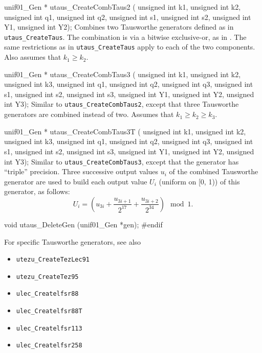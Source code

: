 unif01_Gen * utaus_CreateCombTaus2 (
   unsigned int k1, unsigned int k2, unsigned int q1, unsigned int q2,
   unsigned int s1, unsigned int s2, unsigned int Y1, unsigned int Y2);
\endcode
  \tab  Combines two Tausworthe generators defined as in
   {\tt utaus\_CreateTaus}. The combination is via a bitwise exclusive-or,
   as in \cite{rLEC96a,rTEZ89a,rTEZ91b}.
   The same restrictions as in  {\tt utaus\_CreateTaus} apply to each of the
   two components.
   Also assumes that $k_1\ge k_2$.
  \endtab
\code


unif01_Gen * utaus_CreateCombTaus3 (
    unsigned int k1, unsigned int k2, unsigned int k3,
    unsigned int q1, unsigned int q2, unsigned int q3,
    unsigned int s1, unsigned int s2, unsigned int s3,
    unsigned int Y1, unsigned int Y2, unsigned int Y3);
\endcode
  \tab  Similar to {\tt utaus\_CreateCombTaus2}, except that
   three Tausworthe generators are combined instead of two.
   Assumes that  $k_1 \ge k_2 \ge k_3$.
  \endtab
\code


unif01_Gen * utaus_CreateCombTaus3T (
    unsigned int k1, unsigned int k2, unsigned int k3,
    unsigned int q1, unsigned int q2, unsigned int q3,
    unsigned int s1, unsigned int s2, unsigned int s3,
    unsigned int Y1, unsigned int Y2, unsigned int Y3);
\endcode
  \tab  Similar to  {\tt utaus\_CreateCombTaus3}, except that the
   generator has ``triple'' precision.   Three successive output values
   $u_i$ of the combined Tausworthe generator are used to build each
   output value $U_i$ (uniform on [0, 1)) of this generator, as follows:
  $$
   U_{i} = \left(u_{3i} + \frac{u_{3i+1}}{2^{17}}  +
           \frac{u_{3i+2}}{2^{34}}\right) \mod 1.
  $$
  \endtab



\code

void utaus_DeleteGen (unif01_Gen *gen);
\endcode
 \tab \DelGen
 \endtab
\code
\hide
#endif
\endhide
\endcode




For specific Tausworthe generators, see also
{
\setlength{\partopsep}{0pt}
\setlength{\parskip}{0pt}
\setlength{\topsep}{0pt}
\setlength{\itemsep}{0pt}

\begin{itemize}
\item {\tt utezu\_CreateTezLec91}
\item {\tt utezu\_CreateTez95}
\end{itemize}

\bigskip
\begin{itemize}
\item {\tt ulec\_Createlfsr88}
\item {\tt ulec\_Createlfsr88T}
\item {\tt ulec\_Createlfsr113}
\item {\tt ulec\_Createlfsr258}
\end{itemize}
}
